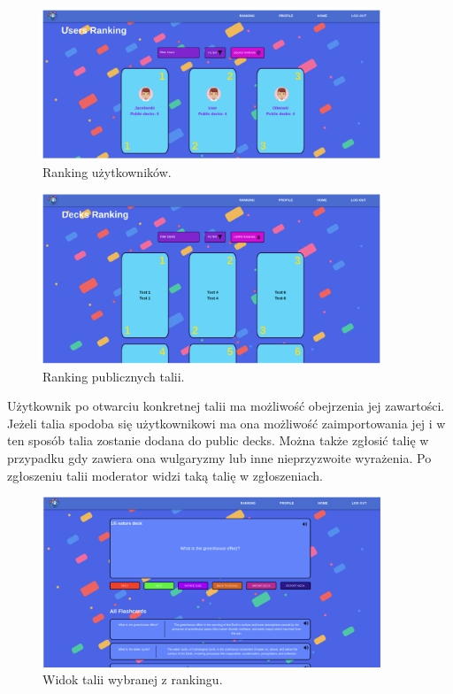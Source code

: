 \begin{figure}[H]
    \centering
    \includegraphics[width=0.9\textwidth]{chapters/chapter_10/images_web/web_user_ranking}
    \caption{Ranking użytkowników.}
    \label{img:web_user_ranking}
\end{figure}


\begin{figure}[H]
    \centering
    \includegraphics[width=0.9\textwidth]{chapters/chapter_10/images_web/web_decks_ranking}
    \caption{Ranking publicznych talii.}
    \label{img:web_decks_ranking}
\end{figure}


Użytkownik po otwarciu konkretnej talii ma możliwość obejrzenia jej zawartości. Jeżeli talia spodoba się użytkownikowi ma ona możliwość zaimportowania jej i w ten sposób talia zostanie dodana do public decks. Można także zgłosić talię w przypadku gdy zawiera ona wulgaryzmy lub inne nieprzyzwoite wyrażenia. Po zgłoszeniu talii moderator widzi taką talię w zgłoszeniach.


\begin{figure}[H]
    \centering
    \includegraphics[width=0.9\textwidth]{chapters/chapter_10/images_web/web_public_deck}
    \caption{Widok talii wybranej z rankingu.}
    \label{img:web_public_deck}
\end{figure}

